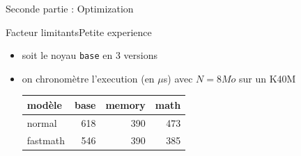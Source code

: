 \documentclass[11pt,mathserif]{beamer}
\begin{document}
\begin{frame}
  \begin{center}
    {\Huge Seconde partie : Optimization}
  \end{center}
\end{frame}

\begin{frame}{Facteur limitants}{Petite experience}
  \begin{itemize}[<+->]
    \item soit le noyau \texttt{base} en 3 versions
      
    \item on chronomètre l'execution (en $\mu$s) avec $N=8Mo$ sur un K40M
      \begin{center}
        \begin{tabular}{|l|r|r|r|}
          \hline
          modèle    & base    & memory & math  \\ 
          \hline
          normal    &  618    &  390   &  473\\ 
          fastmath  &  546    &  390   &  385 \\ 
          \hline
        \end{tabular}
      \end{center}
  \end{itemize}
\end{frame}
\end{document}
